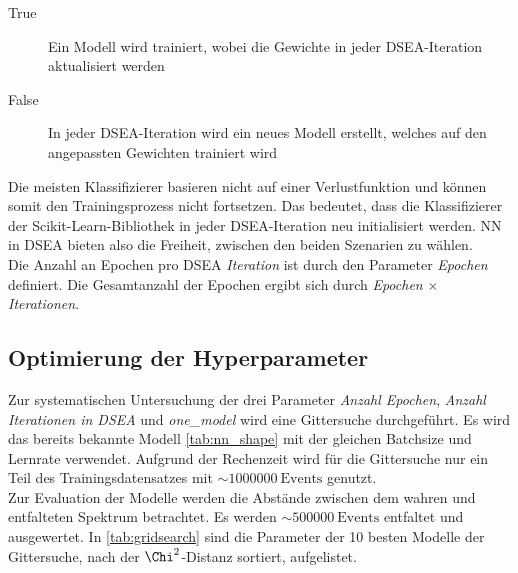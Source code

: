 \begin{description}
    \item [True]Ein Modell wird trainiert, wobei die Gewichte in jeder DSEA-Iteration aktualisiert werden
    \item [False]In jeder DSEA-Iteration wird ein neues Modell erstellt, welches auf den angepassten Gewichten trainiert wird
\end{description}
Die meisten Klassifizierer basieren nicht auf einer Verlustfunktion und können somit den Trainingsprozess nicht fortsetzen.
Das bedeutet, dass die Klassifizierer der Scikit-Learn-Bibliothek in jeder DSEA-Iteration neu initialisiert werden.
NN in DSEA bieten also die Freiheit, zwischen den beiden Szenarien zu wählen.
\\
Die Anzahl an Epochen pro DSEA \textit{Iteration} ist durch den Parameter \textit{Epochen} definiert.
Die Gesamtanzahl der Epochen ergibt sich durch \textit{Epochen} $\times$ \textit{Iterationen}.

\subsection{Optimierung der Hyperparameter}
Zur systematischen Untersuchung der drei Parameter \textit{Anzahl Epochen}, \textit{Anzahl Iterationen in DSEA} und \textit{one\_model} wird eine Gittersuche durchgeführt.
Es wird das bereits bekannte Modell \ref{tab:nn_shape} mit der gleichen Batchsize und Lernrate verwendet.
Aufgrund der Rechenzeit wird für die Gittersuche nur ein Teil des Trainingsdatensatzes mit $\sim \SI{1000000}{\text{Events}}$ genutzt.
\\
Zur Evaluation der Modelle werden die Abstände zwischen dem wahren und entfalteten Spektrum betrachtet.
Es werden $\sim \SI{500000}{\text{Events}}$ entfaltet und ausgewertet.
In \autoref{tab:gridsearch} sind die Parameter der 10 besten Modelle der Gittersuche, nach der $\Chi^2$-Distanz sortiert, aufgelistet.

